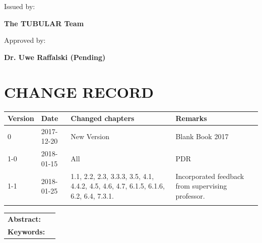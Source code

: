 \documentclass[a4paper,12pt,twoside]{article}
\begin{document}
\begin{flushleft}
\vspace{10pt}

\small
{
Issued by:\\
}

\vspace{0.3cm}

\large
{
\textbf{The TUBULAR Team} \\
}

\vspace{0.3cm}

\small
{
Approved by:\\
}

\vspace{0.3cm}

\large
{
\textbf{Dr. Uwe Raffalski (Pending)}
}
\end{flushleft}




\pagestyle{firstp}
\section*{\small{\textbf{CHANGE RECORD}}}
%

\begin{longtable}{|p{}| p{} |p{} |p{}|}\hline
    \centering
    \textbf{Version}    & \textbf{Date}     & \textbf{Changed chapters} & \textbf{Remarks} \\\hline
    0       &   2017-12-20   & New Version   & Blank Book 2017  \\
    1-0     &   2018-01-15   & All           & PDR \\ 
    1-1     &   2018-01-25   & 1.1, 2.2, 2.3, 3.3.3, 3.5, 4.1, 4.4.2, 4.5, 4.6, 4.7, 6.1.5, 6.1.6, 6.2, 6.4, 7.3.1. & Incorporated feedback from supervising professor.\\ \hline 
    \label{COR}
\end{longtable}

\vspace{1cm}
\begin{tabular}{p{} p{}}
\textbf{Abstract:}     &  %

  &  \\
\textbf{Keywords:}     & %

\end{tabular}
\end{document}
